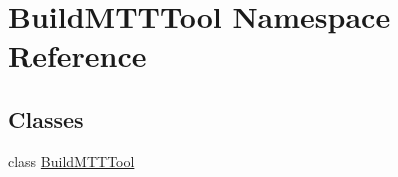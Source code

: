 \hypertarget{namespace_build_m_t_t_tool}{\section{Build\-M\-T\-T\-Tool Namespace Reference}
\label{namespace_build_m_t_t_tool}
}
\subsection*{Classes}
\begin{DoxyCompactItemize}
\item 
class \hyperlink{class_build_m_t_t_tool_1_1_build_m_t_t_tool}{Build\-M\-T\-T\-Tool}
\end{DoxyCompactItemize}
